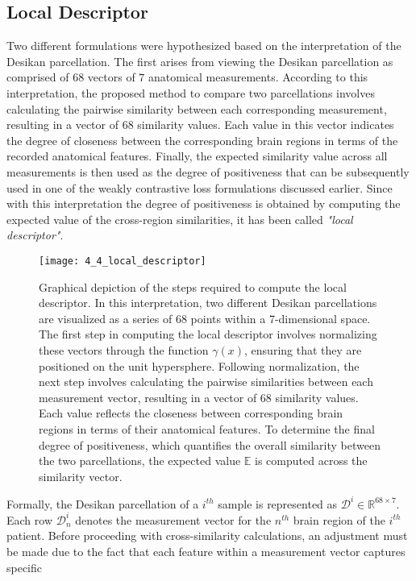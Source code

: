 \subsection{Local Descriptor}
Two different formulations were hypothesized based on the interpretation of the
Desikan parcellation. The first arises from viewing the Desikan parcellation as
comprised of $68$ vectors of $7$ anatomical measurements. According to this
interpretation, the proposed method to compare two parcellations involves
calculating the pairwise similarity between each corresponding measurement,
resulting in a vector of $68$ similarity values. Each value in this vector
indicates the degree of closeness between the corresponding brain regions in
terms of the recorded anatomical features. Finally, the expected similarity
value across all measurements is then used as the degree of positiveness that
can be subsequently used in one of the weakly contrastive loss formulations
discussed earlier. Since with this interpretation the degree of positiveness is
obtained by computing the expected value of the cross-region similarities, it
has been called \emph{"local descriptor"}.
\begin{figure*}[t]
    \texttt{[image: 4\_4\_local\_descriptor]}
    \caption[Local Descriptor]{Graphical depiction of the steps required to compute the local
    descriptor. In this interpretation, two different Desikan parcellations are
    visualized as a series of 68 points within a 7-dimensional space. The first
    step in computing the local descriptor involves normalizing these vectors
    through the function $\gamma(x)$, ensuring that they are positioned on the
    unit hypersphere. Following normalization,
    the next step involves calculating the pairwise similarities between each
    measurement vector, resulting in a vector of 68 similarity values. Each
    value reflects the closeness between corresponding brain regions in terms of
    their anatomical features. To determine the final degree of positiveness,
    which quantifies the overall similarity between the two parcellations, the
    expected value $\mathbb{E}$ is computed across the similarity vector.
    }
\end{figure*}
Formally, the Desikan parcellation of a $i^{th}$ sample is represented as
$\mathcal{D}^i \in \mathbb{R}^{68 \times 7}$. Each row $\mathcal{D}^i_n$ denotes
the measurement vector for the $n^{th}$ brain region of the $i^{th}$ patient.
Before proceeding with cross-similarity calculations, an adjustment must be made
due to the fact that each feature within a measurement vector captures specific
